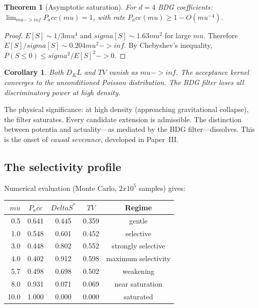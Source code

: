 \documentclass[11pt]{article}
\def\Delta{Delta}%
\def\sigma{sigma}%
\def\mu{mu}%
\def\mathrm#1{#1}%
\def\mathbb#1{#1}%
\def\frac#1#2{#1/#2}%
\def\times{x}%
\def\to{->}%
\def\infty{inf}%
\def\Pacc{P_acc}%
\def\Dkl{D_KL}%
\def\TV{TV}%
\newtheorem{theorem}{Theorem}
\newtheorem{corollary}{Corollary}
\newcommand{\Pacc}{P_{\mathrm{acc}}}
\newcommand{\Dkl}{D_{\mathrm{KL}}}
\newcommand{\TV}{\mathrm{TV}}
\begin{document}
\begin{theorem}[Asymptotic saturation]
\label{thm:saturation}
For $d=4$ BDG coefficients: $\lim_{\mu\to\infty}\Pacc(\mu)=1$, with rate $\Pacc(\mu)\ge 1-O(\mu^{-4})$.
\end{theorem}
\begin{proof}
$\mathbb{E}[S]\sim\frac{1}{3}\mu^4$ and $\sigma[S]\sim 1.63\mu^2$ for large $\mu$. Therefore $\mathbb{E}[S]/\sigma[S]\sim 0.204\mu^2\to\infty$. By Chebyshev's inequality, $\mathbb{P}(S\le 0)\le\sigma^2/\mathbb{E}[S]^2\to 0$.
\end{proof}

\begin{corollary}
Both $\Dkl$ and $\TV$ vanish as $\mu\to\infty$. The acceptance kernel converges to the unconditioned Poisson distribution. The BDG filter loses all discriminatory power at high density.
\end{corollary}

The physical significance: at high density (approaching gravitational collapse), the filter saturates. Every candidate extension is admissible. The distinction between potentia and actuality---as mediated by the BDG filter---dissolves. This is the onset of \emph{causal severance}, developed in Paper~III.

\subsection{The selectivity profile}

Numerical evaluation (Monte Carlo, $2\times 10^5$ samples) gives:

\begin{center}
\begin{tabular}{rcccc}
\toprule
$\mu$ & $\Pacc$ & $\Delta S^*$ & $\TV$ & Regime \\
\midrule
0.5 & 0.641 & 0.445 & 0.359 & gentle \\
1.0 & 0.548 & 0.601 & 0.452 & selective \\
3.0 & 0.448 & 0.802 & 0.552 & strongly selective \\
4.0 & 0.402 & 0.912 & 0.598 & maximum selectivity \\
5.7 & 0.498 & 0.698 & 0.502 & weakening \\
8.0 & 0.931 & 0.071 & 0.069 & near saturation \\
10.0 & 1.000 & 0.000 & 0.000 & saturated \\
\bottomrule
\end{tabular}
\end{center}
\end{document}
